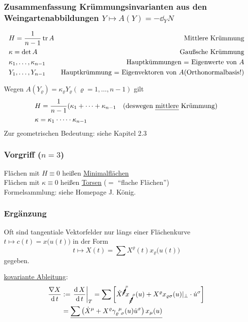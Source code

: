 \subsubsection{Zusammenfassung Krümmungsinvarianten aus den Weingartenabbildungen \(Y \mapsto A(Y) = -\dd_Y N\)}
\begin{align*}
 &H = \frac{1}{n-1} \operatorname{tr} A & \text{Mittlere Krümmung} \\
 &\kappa = \det A & \text{Gaußsche Krümmung} \\
 &\kappa_1, \dots, \kappa_{n-1} & \text{Hauptkümmungen = Eigenwerte von }A \\
 &Y_1, \dots, Y_{n-1} & \text{Hauptkrümmung = Eigenvektoren von }A \text{(Orthonormalbasis!)}
\end{align*}

\begin{folgerung}
 Wegen \(A(Y_\varrho) = \kappa_\varrho Y_\varrho (\varrho = 1, \dots, n-1)\) gilt
 \begin{align*}
  &H = \frac{1}{n-1} (\kappa_1 + \dots + \kappa_{n-1} & \text{(deswegen \uline{mittlere} Krümmung)} \\
  & \kappa = \kappa_1 \cdot \dots \cdot \kappa_{n-1}
 \end{align*}
Zur geometrischen Bedeutung: siehe Kapitel 2.3
\end{folgerung}

\subsubsection{Vorgriff ($n=3$)}
Flächen mit \(H \equiv 0\) heißen \uline{Minimalflächen} \\
Flächen mit \(\kappa \equiv 0\) heißen \uline{Torsen} (\(=\) ``flache Flächen'') \\
Formelsammlung: siehe Homepage J. König.
\subsubsection{Ergänzung}
Oft sind tangentiale Vektorfelder nur längs einer Flächenkurve \(t \mapsto c(t) = x\big(u(t)\big)\) in der Form 
\[
 t \mapsto X(t) = \sum X^\varrho(t)x_{\varrho}\big(u(t)\big)
\]
gegeben.
\begin{bsp}
  \uline{kovariante Ableitung}:
  \begin{align*}
   \frac{\nabla X}{\dd t} &:= \left.\frac{\dd X}{\dd t} \right|_T = \sum \left[\dot X^{\cancelto{\mu}{\varrho}} x_{\cancelto{\mu}\varrho} \;\,(u) + X^\varrho x_{\varrho \sigma} (u)|_\perp \cdot \dot u^\sigma\right] \\
   &= \uline{\sum \left( \dot X^\mu + X^\varrho \christ \varrho \mu \sigma (u) \dot u^\sigma \right) x_\mu(u)}
  \end{align*}
\end{bsp}

